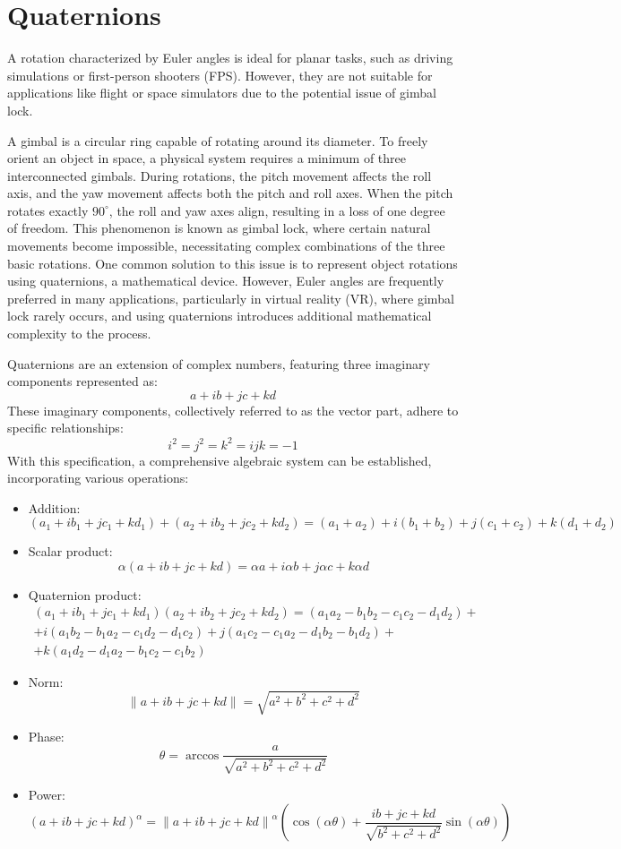 \section{Quaternions}

A rotation characterized by Euler angles is ideal for planar tasks, such as driving simulations or first-person shooters (FPS). 
However, they are not suitable for applications like flight or space simulators due to the potential issue of gimbal lock.

A gimbal is a circular ring capable of rotating around its diameter. 
To freely orient an object in space, a physical system requires a minimum of three interconnected gimbals. 
During rotations, the pitch movement affects the roll axis, and the yaw movement affects both the pitch and roll axes. 
When the pitch rotates exactly $90^\circ$, the roll and yaw axes align, resulting in a loss of one degree of freedom. 
This phenomenon is known as gimbal lock, where certain natural movements become impossible, necessitating complex combinations of the three basic rotations. 
One common solution to this issue is to represent object rotations using quaternions, a mathematical device. 
However, Euler angles are frequently preferred in many applications, particularly in virtual reality (VR), where gimbal lock rarely occurs, and using quaternions introduces additional mathematical complexity to the process.

Quaternions are an extension of complex numbers, featuring three imaginary components represented as: 
\[a+ib+jc+kd\]
These imaginary components, collectively referred to as the vector part, adhere to specific relationships:
\[i^2=j^2=k^2=ijk=-1\]
With this specification, a comprehensive algebraic system can be established, incorporating various operations:
\begin{itemize}
    \item Addition: 
        \[(a_1 + ib_1 + jc_1+kd_1) + (a_2+ib_2+ jc_2 +kd_2 ) = (a_1+a_2 ) +i(b_1+b_2 ) + j (c_1+c_2) +k(d_1+d_2 )\]
    \item Scalar product: 
        \[\alpha (a+ib+ jc+kd) =\alpha a+i \alpha b+ j  \alpha c+k  \alpha d\]
    \item Quaternion product: 
        \begin{multline*}
            (a_1 + ib_1 + jc_1+kd_1)(a_2+ib_2+ jc_2 +kd_2 ) = (a_1a_2-b_1b_2-c_1c_2-d_1d_2)+ \\
            +i(a_1b_2-b_1a_2-c_1d_2-d_1c_2)+j(a_1c_2-c_1a_2-d_1b_2-b_1d_2)+\\
            +k(a_1d_2-d_1a_2-b_1c_2-c_1b_2)
        \end{multline*}
    \item Norm: 
        \[\left\lVert a+ib+jc+kd \right\rVert =\sqrt{a^2+b^2+c^2+d^2}\]
    \item Phase: 
        \[\theta=\arccos \dfrac{a}{\sqrt{a^2+b^2+c^2+d^2}}\]
    \item Power: 
        \[{(a+ib+jc+kd)}^\alpha=\left\lVert a+ib+jc+kd \right\rVert^\alpha\left( \cos(\alpha\theta)+\dfrac{ib+jc+kd}{\sqrt{b^2+c^2+d^2}}\sin(\alpha\theta) \right)\]
\end{itemize}

